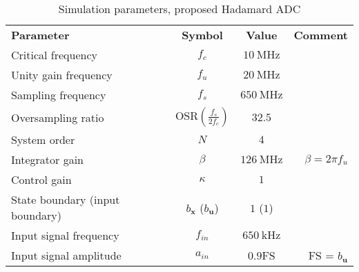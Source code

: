 
\begin{table}[htbp]
    \centering
    \caption{Simulation parameters, proposed Hadamard ADC}
      \begin{tabular}{lccr}
      \rowcolor[rgb]{ 0,  0,  0} \textcolor[rgb]{ 1,  1,  1}{\textbf{Parameter}}	 & \textcolor[rgb]{ 1,  1,  1}{\textbf{Symbol}}
                               & \textcolor[rgb]{ 1,  1,  1}{\textbf{Value}} & \textcolor[rgb]{ 1,  1,  1}{\textbf{Comment}}          \\
      Critical frequency       & $f_c$            & $\SI{10}{\mega\hertz}$          &                                                  \\
      Unity gain frequency     & $f_u$            & $\SI{20}{\mega\hertz}$          &                                                  \\
      Sampling frequency       & $f_s$            & $\SI{650}{\mega\hertz}$         &                                                  \\
      Oversampling ratio       & $\text{OSR} \left( \frac{f_s}{2f_c} \right)$       & $32.5$                                            \\
      System order             & $N$              & $4$                             &                                                   \\
      Integrator gain          & $\beta$          & $\SI{126}{\mega\hertz}$         & $\beta = 2\pi f_u$                                \\
      Control gain             & $\kappa$         & $1$                             &                                                    \\
      State boundary (input boundary)  & $b_{\bm{x}}$ ($b_{\bm{u}}$)    & $1$ ($1$) &                                                    \\
      Input signal frequency   & $f_{in}$         & $\SI{650}{\kilo\hertz}$         &                                                       \\
      Input signal amplitude   & $a_{in}$         & $0.9$FS                         & FS = $b_{\bm{u}}$

      \end{tabular}
    \label{tab:HCI_params}
  \end{table}
